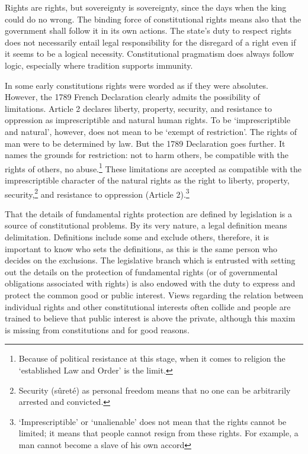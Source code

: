 \begin{multicols}{2}
\vspace{-.1cm}

\noi
Rights are rights, but sovereignty is sovereignty, since the days when the king could do no
wrong. The binding force of constitutional rights means also that the government shall follow
it in its own actions. The state’s duty to respect rights does not necessarily entail legal
responsibility for the disregard of a right even if it seems to be a logical necessity.
Constitutional pragmatism does always follow logic, especially where tradition supports
immunity.


\noi
In some early constitutions rights were worded as if they were absolutes. However, the 1789
French Declaration clearly admits the possibility of limitations. Article 2 declares liberty,
property, security, and resistance to oppression as imprescriptible and natural human rights.
To be ‘imprescriptible and natural’, however, does not mean to be ‘exempt of restriction’.
The rights of man were to be determined by law. But the 1789 Declaration goes further. It
names the grounds for restriction: not to harm others, be compatible with the rights of others,
no abuse.\footnote{Because of political resistance at this stage, when it comes to religion the ‘established Law and Order’ is the limit.} These limitations are accepted as compatible with the imprescriptible character of the natural rights as the right to liberty, property, security,\footnote{Security (sûreté) as personal freedom means that no one can be arbitrarily arrested and convicted.} and resistance to oppression
(Article 2).\footnote{‘Imprescriptible’ or ‘unalienable’ does not mean that the rights cannot be limited; it means that people cannot resign from these rights. For example, a man cannot become a slave of his own accord}

\noi
That the details of fundamental rights protection are defined by legislation is a source of
constitutional problems. By its very nature, a legal definition means delimitation. Definitions
include some and exclude others, therefore, it is important to know who sets the definitions,
as this is the same person who decides on the exclusions. The legislative branch which
is entrusted with setting out the details on the protection of fundamental rights (or of
governmental obligations associated with rights) is also endowed with the duty to express and
protect the common good or public interest. Views regarding the relation between individual
rights and other constitutional interests often collide and people are trained to believe that
public interest is above the private, although this maxim is missing from constitutions and for
good reasons.


\end{multicols}

